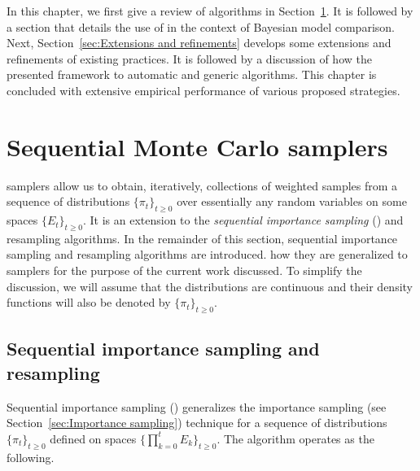 In this chapter, we first give a review of \smc algorithms in Section~\ref{sec:Sequential Monte Carlo samplers}. It is followed by a section that details the use of \smc in the context of Bayesian model comparison. Next, Section~\ref{sec:Extensions and refinements} develops some extensions and refinements of existing practices. It is followed by a discussion of how the presented framework  to automatic and generic algorithms. This chapter is concluded with extensive empirical performance  of various proposed strategies.

\section{Sequential Monte Carlo samplers}
\label{sec:Sequential Monte Carlo samplers}

\smc samplers allow us to obtain, iteratively, collections of weighted samples from a sequence of distributions $\{\pi_t\}_{t\ge0}$ over essentially any random variables on some spaces $\{E_t\}_{t\ge0}$. It is an extension to the \emph{sequential importance sampling} (\sis) and resampling algorithms. In the remainder of this section, sequential importance sampling and resampling algorithms are introduced.  how they are generalized to \smc samplers for the purpose of the current work  discussed. To simplify the discussion, we will assume that the distributions are continuous and their density functions will also be denoted by $\{\pi_t\}_{t\ge0}$.

\subsection{Sequential importance sampling and resampling}
\label{sub:Sequential importance sampling and resampling}

Sequential importance sampling (\sis) generalizes the importance sampling (see Section~\ref{sec:Importance sampling}) technique for a sequence of distributions $\{\pi_t\}_{t\ge0}$ defined on spaces $\{\prod_{k=0}^tE_k\}_{t\ge0}$. The algorithm operates as the following.

